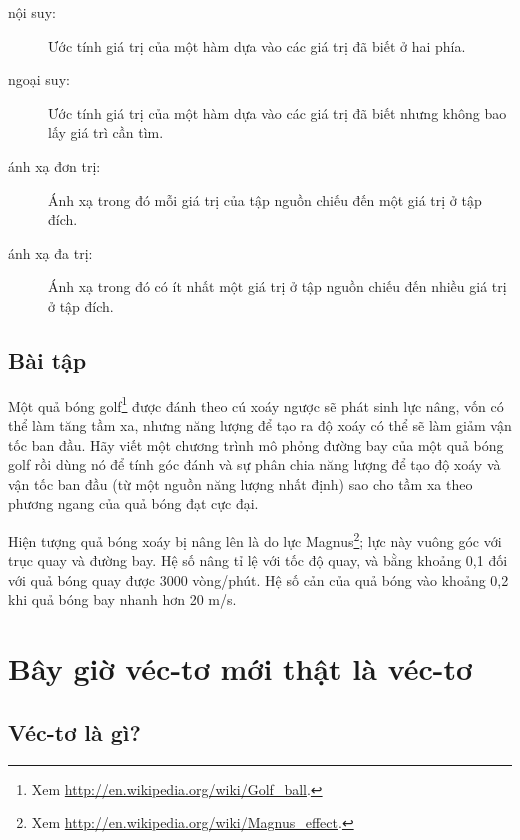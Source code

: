 \documentclass[12pt]{book}
\begin{document}
\begin{description}

\item[nội suy:] Ước tính giá trị của một hàm dựa vào các giá trị đã biết 
ở hai phía.

\item[ngoại suy:] Ước tính giá trị của một hàm dựa vào các giá trị đã biết 
nhưng không bao lấy giá trì cần tìm.

\item[ánh xạ đơn trị:] Ánh xạ trong đó mỗi giá trị của tập nguồn chiếu 
đến một giá trị ở tập đích.

\item[ánh xạ đa trị:] Ánh xạ trong đó có ít nhất một giá trị ở tập nguồn chiếu 
đến nhiều giá trị ở tập đích.

\end{description}


\section{Bài tập}

\begin{ex}
\label{golf}

Một quả bóng golf\footnote{Xem
\url{http://en.wikipedia.org/wiki/Golf_ball}.} được đánh theo cú xoáy ngược 
sẽ phát sinh lực nâng, vốn có thể làm tăng tầm xa, nhưng năng lượng để 
tạo ra độ xoáy có thể sẽ làm giảm vận tốc ban đầu. Hãy viết một chương trình 
mô phỏng đường bay của một quả bóng golf rồi dùng nó để tính góc đánh 
và sự phân chia năng lượng để tạo độ xoáy và vận tốc ban đầu (từ một 
nguồn năng lượng nhất định) sao cho tầm xa theo phương ngang của quả 
bóng đạt cực đại.

Hiện tượng quả bóng xoáy bị nâng lên là do lực Magnus\footnote{Xem 
\url{http://en.wikipedia.org/wiki/Magnus_effect}.}; lực này vuông góc với 
trục quay và đường bay. Hệ số nâng tỉ lệ với tốc độ quay, và bằng khoảng 
0,1 đối với quả bóng quay được 3000 vòng/phút. Hệ số cản của quả bóng 
vào khoảng 0,2 khi quả bóng bay nhanh hơn 20 m/s.
\end{ex}



\chapter{Bây giờ véc-tơ mới thật là véc-tơ}

\section{Véc-tơ là gì?}
\end{document}
